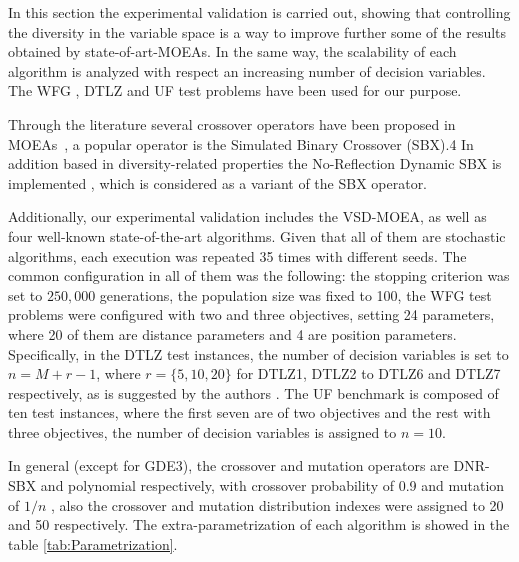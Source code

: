 In this section the experimental validation is carried out, showing that controlling the diversity in the variable space is a way to improve further some of the results obtained by state-of-art-MOEAs.%
%
In the same way, the scalability of each algorithm is analyzed with respect an increasing number of decision variables.
%
The WFG \cite{Joel:WFG}, DTLZ \cite{Joel:DTLZ}  and UF \cite{Joel:CEC2009}  test problems have been used for our purpose. 
%

Through the literature several crossover operators have been proposed in MOEAs~\cite{Joel:ParentMeanCentricSelfAdaptation},  
a popular operator is the Simulated Binary Crossover (SBX).4\cite{Joel:SBX1994}%
%	
In addition based in diversity-related properties the No-Reflection Dynamic SBX is implemented \cite{Joel:DNR_SBX}, which is considered as a variant of the SBX operator.


%
Additionally, our experimental validation includes the VSD-MOEA, as well as four well-known state-of-the-art algorithms.
%
Given that all of them are stochastic algorithms, each execution was repeated 35 times with different seeds.
%
The common configuration in all of them was the following: the stopping criterion was set to $250,000$ generations, the population size was fixed to 100, the WFG test problems were configured with two and three objectives, setting 24 parameters, where 20 of them are distance parameters and 4 are position parameters.
%
Specifically, in the DTLZ test instances, the number of decision variables is set to $n=M+r-1$, where $r=\{5, 10, 20\}$ for DTLZ1, DTLZ2 to DTLZ6 and DTLZ7 respectively, as is suggested by the authors \cite{Joel:DTLZ}.  
% 
The UF benchmark is composed of ten test instances, where the first seven are of two objectives and the rest with three objectives, the number of decision variables is assigned to $n=10$.

%
In general (except for GDE3), the crossover and mutation operators are DNR-SBX and polynomial respectively, with crossover probability of 0.9 and mutation of $1/n$  \cite{Joel:Mutation}, also the crossover and mutation distribution indexes were assigned to 20 and 50 respectively.
%
The extra-parametrization of each algorithm is showed in the table \ref{tab:Parametrization}.
%

